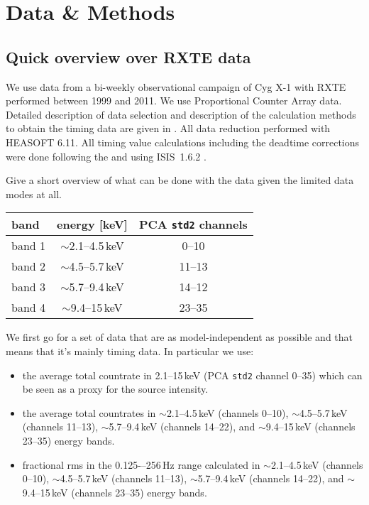 \documentclass{aa}
\begin{document}
\section{Data \& Methods}

\subsection{Quick overview over RXTE data}

We use data from a bi-weekly observational campaign of Cyg X-1 with
RXTE performed between 1999 and 2011. We use Proportional Counter
Array \citep[PCA;][]{Jahoda_2006a} data.  Detailed description of data
selection and description of the calculation methods to obtain the
timing data are given in \citep{Grinberg_2014a}. All data reduction
performed with HEASOFT 6.11. All timing value calculations including
the deadtime corrections were done following the \citet{Nowak_1999a}
and \citet{Pottschmidt_2003b} using ISIS~1.6.2
\citep{Houck_Denicola_2000a,Houck_2002,Noble_Nowak_2008a}.

Give a short overview of what can be done with
the data given the limited data modes at all.

\begin{table}
\begin{tabular}{l|cc}
band &energy [keV]& PCA \texttt{std2}
  channels\\
\hline
band 1 &$\sim$2.1--4.5\,keV& 0--10 \\
band 2 &$\sim$4.5--5.7\,keV& 11--13 \\
band 3 & $\sim$5.7--9.4\,keV& 14--12 \\
band 4 &$\sim$9.4--15\,keV& 23--35 \\
\end{tabular}
\end{table}


We first go for a set of data that are as model-independent as
possible and that means that it's mainly timing data. In particular we
use:

\begin{itemize}
\item the average total countrate in 2.1--15\,keV (PCA \texttt{std2}
  channel 0--35) which can be seen as a proxy for the source
  intensity.
\item the average total countrates in $\sim$2.1--4.5\,keV (channels 0--10),
  $\sim$4.5--5.7\,keV (channels 11--13), $\sim$5.7--9.4\,keV (channels
  14--22), and $\sim$9.4--15\,keV (channels 23--35) energy bands.
\item fractional rms in the 0.125-–256\,Hz range calculated in
  $\sim$2.1--4.5\,keV (channels 0--10),
  $\sim$4.5--5.7\,keV (channels 11--13), $\sim$5.7--9.4\,keV (channels
  14--22), and $\sim$9.4--15\,keV (channels 23--35) energy bands.
\end{itemize}
\end{document}
